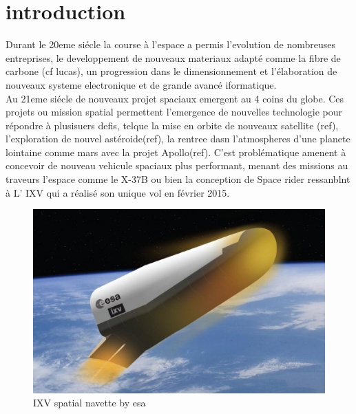 \newpage

\section{introduction}

Durant le 20eme siécle la course à l'espace a permis l'evolution de nombreuses entreprises, le developpement de nouveaux materiaux adapté comme la fibre de carbone (cf lucas), un progression dans le dimensionnement et l'élaboration de nouveaux systeme electronique et de grande avancé iformatique.\\
Au 21eme siécle de nouveaux projet spaciaux emergent au 4 coins du globe. Ces projets ou mission spatial permettent l'emergence de nouvelles technologie pour répondre à plusisuers defis, telque la mise en orbite de nouveaux satellite (ref), l'exploration de nouvel astéroide(ref), la rentree dasn l'atmospheres d'une planete lointaine comme mars avec la projet Apollo(ref). C'est problématique amenent à concevoir de nouveau vehicule spaciaux plus performant, menant des missions au traveurs l'espace comme le X-37B ou bien la conception de Space rider ressanblnt à L' IXV qui a réalisé son unique vol en février 2015.\\

\begin{figure}[h!]
 \centering
 \includegraphics[width=0.6\linewidth]{chapter1_introduction/pictures/IXV_pillars.jpg}
 \vspace{-2ex}
 \caption{IXV spatial navette by esa}
  \vspace{2ex}
 \label{IXV}
\end{figure}

